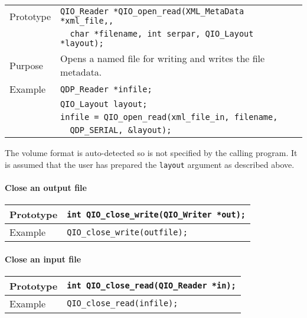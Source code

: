 \documentclass{article}
\begin{document}
\begin{flushleft}
  \begin{tabular}{|l|l|}
  \hline
  Prototype      & \verb|QIO_Reader *QIO_open_read(XML_MetaData *xml_file,,|\\
                 & \verb|  char *filename, int serpar, QIO_Layout *layout);|\\
  Purpose        & Opens a named file for writing and writes the file metadata. \\
\hline
  Example  & \verb|QDP_Reader *infile;| \\
           & \verb|QIO_Layout layout;| \\
           & \verb|infile = QIO_open_read(xml_file_in, filename, |\\
	   & \verb|  QDP_SERIAL, &layout);| \\
   \hline
 \end{tabular}
\end{flushleft}
%
The volume format is auto-detected so is not specified by the calling
program.  It is assumed that the user has prepared the \verb|layout|
argument as described above.


\paragraph{Close an output file}

\begin{flushleft}
  \begin{tabular}{|l|l|}
  \hline
  Prototype      & \verb|int QIO_close_write(QIO_Writer *out);| \\
\hline
  Example  & \verb|QIO_close_write(outfile);|\\
   \hline
 \end{tabular}
\end{flushleft}

\paragraph{Close an input file}

\begin{flushleft}
  \begin{tabular}{|l|l|}
  \hline
  Prototype      & \verb|int QIO_close_read(QIO_Reader *in);| \\
\hline
  Example  & \verb|QIO_close_read(infile);|\\
   \hline
 \end{tabular}
\end{flushleft}
\end{document}
